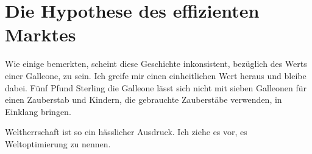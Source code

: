 \chapter{Die Hypothese des effizienten Marktes}

\begin{chapterOpeningAuthorNote}
% 
Wie einige bemerkten, scheint diese Geschichte inkonsistent, bezüglich des Werts einer Galleone, zu sein. Ich greife mir einen einheitlichen Wert heraus und bleibe dabei. Fünf Pfund Sterling die Galleone lässt sich nicht mit sieben Galleonen für einen Zauberstab und Kindern, die gebrauchte Zauberstäbe verwenden, in Einklang bringen.
\end{chapterOpeningAuthorNote}
\begin{chapterOpeningQuote}
Weltherrschaft ist so ein hässlicher Ausdruck. Ich ziehe es vor, es Weltoptimierung zu nennen.
\end{chapterOpeningQuote}

